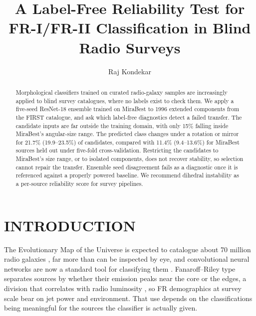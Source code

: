 \documentclass{aastex701}
\begin{document}
\title{A Label-Free Reliability Test for FR-I/FR-II Classification in Blind Radio Surveys}

\author[0009-0008-8798-2540]{Raj Kondekar}

\begin{abstract}
Morphological classifiers trained on curated radio-galaxy samples are increasingly applied
to blind survey catalogues, where no labels exist to check them. We apply a five-seed
ResNet-18 ensemble trained on MiraBest to 1996 extended components from the FIRST catalogue,
and ask which label-free diagnostics detect a failed transfer. The candidate inputs are far
outside the training domain, with only 15\% falling inside MiraBest's angular-size range. The
predicted class changes under a rotation or mirror for 21.7\% (19.9--23.5\%) of candidates,
compared with 11.4\% (9.4--13.6\%) for MiraBest sources held out under five-fold
cross-validation. Restricting the candidates to MiraBest's size range, or to isolated
components, does not recover stability, so selection cannot repair the transfer. Ensemble
seed disagreement fails as a diagnostic once it is referenced against a properly powered
baseline. We recommend dihedral instability as a per-source reliability score for survey
pipelines.
\end{abstract}


\section{INTRODUCTION}

The Evolutionary Map of the Universe is expected to catalogue about 70 million radio
galaxies \citep{norris2011}, far more than can be inspected by eye, and convolutional neural
networks are now a standard tool for classifying them \citep{aniyan2017}. Fanaroff--Riley
type separates sources by whether their emission peaks near the core or the edges, a
division that correlates with radio luminosity \citep{fanaroff1974}, so FR demographics at
survey scale bear on jet power and environment. That use depends on the classifications
being meaningful for the sources the classifier is actually given.
\end{document}
